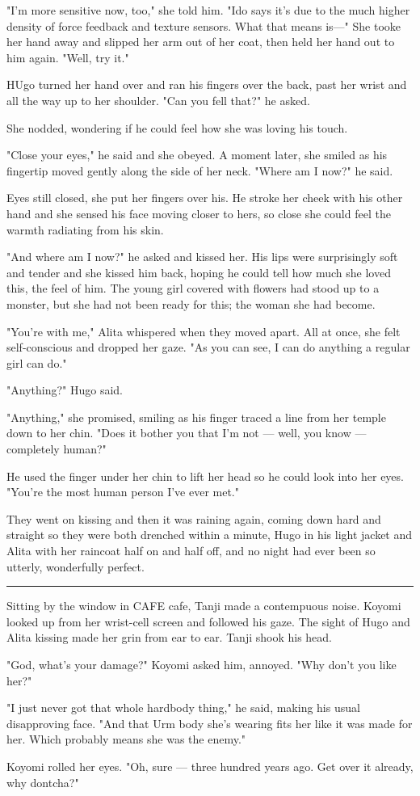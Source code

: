 \documentclass[11pt]{article}
\begin{document}
"I'm more sensitive now, too," she told him. "Ido says it's due to the much higher density of force feedback and texture sensors. What that means is---" She tooke her hand away and slipped her arm out of her coat, then held her hand out to him again. "Well, try it."

HUgo turned her hand over and ran his fingers over the back, past her wrist and all the way up to her shoulder. "Can you fell that?" he asked.

She nodded, wondering if he could feel how she was loving his touch.

"Close your eyes," he said and she obeyed. A moment later, she smiled as his fingertip moved gently along the side of her neck. "Where am I now?" he said.

Eyes still closed, she put her fingers over his. He stroke her cheek with his other hand and she sensed his face moving closer to hers, so close she could feel the warmth radiating from his skin.

"And where am I now?" he asked and kissed her. His lips were surprisingly soft and tender and she kissed him back, hoping he could tell how much she loved this, the feel of him. The young girl covered with flowers had stood up to a monster, but she had not been ready for this; the woman she had become.

"You're with me," Alita whispered when they moved apart. All at once, she felt self-conscious and dropped her gaze. "As you can see, I can do anything a regular girl can do."

"Anything?" Hugo said.

"Anything," she promised, smiling as his finger traced a line from her temple down to her chin. "Does it bother you that I'm not --- well, you know --- completely human?"

He used the finger under her chin to lift her head so he could look into her eyes. "You're the most human person I've ever met."

They went on kissing and then it was raining again, coming down hard and straight so they were both drenched within a minute, Hugo in his light jacket and Alita with her raincoat half on and half off, and no night had ever been so utterly, wonderfully perfect.




\rule{\linewidth}{0.5pt}




Sitting by the window in CAFE cafe, Tanji made a contempuous noise. Koyomi looked up from her wrist-cell screen and followed his gaze. The sight of Hugo and Alita kissing made her grin from ear to ear. Tanji shook his head.

"God, what's your damage?" Koyomi asked him, annoyed. "Why don't you like her?"

"I just never got that whole hardbody thing," he said, making his usual disapproving face. "And that Urm body she's wearing fits her like it was made for her. Which probably means she was the enemy."

Koyomi rolled her eyes. "Oh, sure --- three hundred years ago. Get over it already, why dontcha?"
\end{document}
